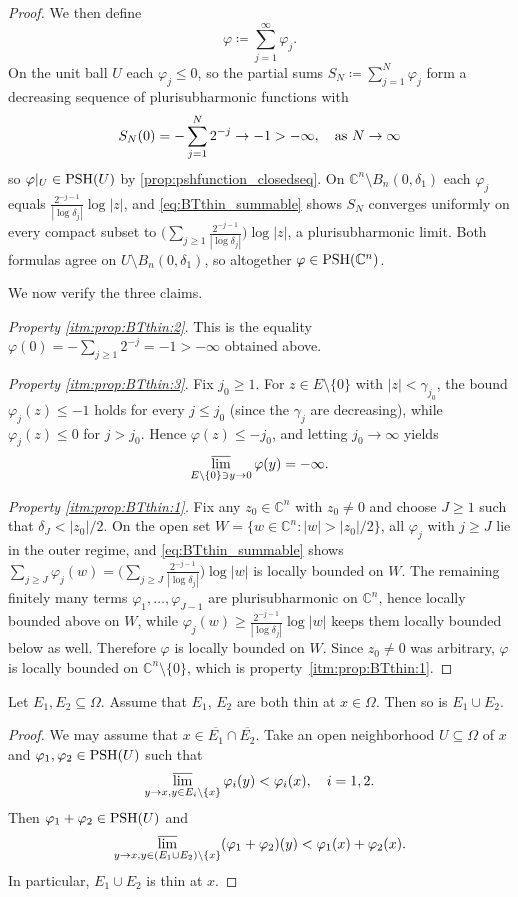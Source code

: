 \begin{proof}
We then define
\[
    \varphi\coloneqq \sum_{j=1}^{\infty}\varphi_j.
\]
On the unit ball $U$ each $\varphi_j\leq 0$, so the partial sums $S_N\coloneqq \sum_{j=1}^N\varphi_j$ form a decreasing sequence of plurisubharmonic functions with
\[
    S_N(0)=-\sum_{j=1}^N 2^{-j}\to -1>-\infty,\quad \textup{as } N\to\infty
\]
so $\varphi|_U\in \mathrm{PSH}(U)$ by \cref{prop:pshfunction_closedseq}. On $\mathbb{C}^n\setminus B_n(0,\delta_1)$ each $\varphi_j$ equals $\frac{2^{-j-1}}{|\log\delta_j|}\log|z|$, and \eqref{eq:BTthin_summable} shows $S_N$ converges uniformly on every compact subset to $\bigl(\sum_{j\geq 1}\tfrac{2^{-j-1}}{|\log\delta_j|}\bigr)\log|z|$, a plurisubharmonic limit. Both formulas agree on $U\setminus B_n(0,\delta_1)$, so altogether $\varphi\in \mathrm{PSH}(\mathbb{C}^n)$.

We now verify the three claims.

  \emph{Property \ref{itm:prop:BTthin:2}}. This is the equality $\varphi(0)=-\sum_{j\geq 1}2^{-j}=-1>-\infty$ obtained above.

  \emph{Property \ref{itm:prop:BTthin:3}}. Fix $j_0\geq 1$. For $z\in E\setminus\{0\}$ with $|z|<\gamma_{j_0}$, the bound $\varphi_j(z)\leq -1$ holds for every
  $j\leq j_0$ (since the $\gamma_j$ are decreasing), while $\varphi_j(z)\leq 0$ for $j>j_0$. Hence $\varphi(z)\leq -j_0$, and
  letting $j_0\to \infty$ yields
  \[
    \varlimsup_{E\setminus \{0\} \ni y\to 0}\varphi(y)=-\infty.
  \]

  \emph{Property \ref{itm:prop:BTthin:1}.} Fix any $z_0\in \mathbb{C}^n$ with $z_0\neq 0$ and choose $J\geq 1$ such that $\delta_J<|z_0|/2$. On the open set
  $W=\{w\in \mathbb{C}^n:|w|>|z_0|/2\}$, all $\varphi_j$ with $j\geq J$ lie in the outer regime, and \eqref{eq:BTthin_summable} shows $\sum_{j\geq J}\varphi_j(w)
   =\bigl(\sum_{j\geq J}\tfrac{2^{-j-1}}{|\log\delta_j|}\bigr)\log|w|$ is locally bounded on $W$. The remaining finitely many terms $\varphi_1,\ldots,\varphi_{J-1}$ are plurisubharmonic on $\mathbb{C}^n$, hence locally bounded above on $W$, while $\varphi_j(w)\geq \tfrac{2^{-j-1}}{|\log\delta_j|}\log|w|$ keeps
  them locally bounded below as well. Therefore $\varphi$ is locally bounded on $W$. Since $z_0\neq 0$ was arbitrary, $\varphi$ is locally bounded on $\mathbb{C}^n\setminus\{0\}$, which is property~\ref{itm:prop:BTthin:1}.
\end{proof}

\begin{lemma}\label{lma:unionthin}
    Let $E_1,E_2\subseteq \Omega$. Assume that $E_1$, $E_2$ are both thin at $x\in \Omega$. Then so is $E_1\cup E_2$.
\end{lemma}
\begin{proof}
    We may assume that $x\in \overline{E_1}\cap \overline{E_2}$. Take an open neighborhood $U\subseteq \Omega$ of $x$ and $\varphi_1,\varphi_2\in \mathrm{PSH}(U)$ such that
    \[
        \varlimsup_{y\to x,y\in E_i\setminus\{x\}} \varphi_i(y)<\varphi_i(x),\quad i=1,2.
    \]
    Then $\varphi_1+\varphi_2\in \mathrm{PSH}(U)$ and
    \[
    \varlimsup_{y\to x,y\in (E_1\cup E_2)\setminus\{x\}} (\varphi_1+\varphi_2)(y)<\varphi_1(x)+\varphi_2(x).
    \]
    In particular, $E_1\cup E_2$ is thin at $x$.
\end{proof}

